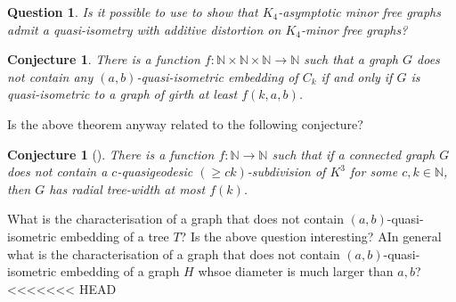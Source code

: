\documentclass[a4paper]{article}
\newtheorem{Question}{Question}
\newtheorem{conjecture}[theorem]{Conjecture}
\begin{document}
 
 
 
 \begin{Question}
 	Is it possible to use  to show that $K_4$-asymptotic minor free graphs admit a quasi-isometry with additive distortion on $K_4$-minor free graphs?
 \end{Question}
 

 
% 
  \begin{conjecture}\label{lem:cycle}
 	There is a function $f\colon \mathbb{N}\times \mathbb{N} \times \mathbb{N} \rightarrow \mathbb{N}$ such that a graph $G$  does not contain any $(a,b)$-quasi-isometric embedding of $C_k$ if and only if $G$ is quasi-isometric to a graph of girth at least $f(k,a,b)$.
 \end{conjecture}

 
 Is the above theorem anyway related to the following conjecture?
 
 \begin{conjecture}[\cite{albrechtsen2023structural}]
There is a function $f\colon \mathbb{N} \rightarrow \mathbb{N}$ such that if a connected graph $G$ does not contain a $c$-quasigeodesic $(\geq ck)$-subdivision of $K^3$ for some $c,k \in \mathbb{N}$, then $G$ has radial tree-width at most $f(k)$. 
 \end{conjecture}


	What is the characterisation of a graph that does not contain $(a,b)$-quasi-isometric embedding of a tree $T$? Is the above question interesting? AIn general what is the characterisation of a graph that does not contain $(a,b)$-quasi-isometric embedding of a graph $H$ whsoe diameter is much larger than $a,b$? 
<<<<<<< HEAD
\end{document}
